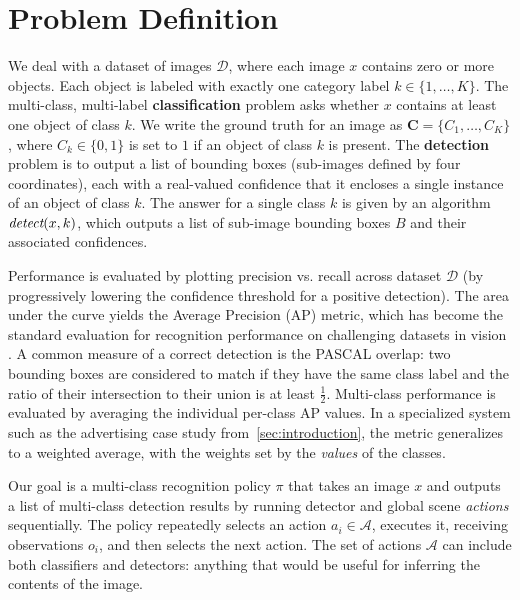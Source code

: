 \section{Problem Definition}\label{sec:det_problem}



We deal with a dataset of images $\mathcal{D}$, where each image $x$ contains zero or more objects.
Each object is labeled with exactly one category label $k \in \{1, \dots, K\}$.
The multi-class, multi-label \textbf{classification} problem asks whether $x$ contains at least one object of class $k$.
We write the ground truth for an image as $\mathbf{C}=\{C_1, \dots, C_K\}$, where $C_k \in \{0, 1\}$ is set to $1$ if an object of class $k$ is present.
The \textbf{detection} problem is to output a list of bounding boxes (sub-images defined by four coordinates), each with a real-valued confidence that it encloses a single instance of an object of class $k$.
The answer for a single class $k$ is given by an algorithm $\emph{detect}(x,k)$, which outputs a list of sub-image bounding boxes $B$ and their associated confidences.

Performance is evaluated by plotting precision vs. recall across dataset $\mathcal{D}$ (by progressively lowering the confidence threshold for a positive detection).
The area under the curve yields the Average Precision (AP) metric, which has become the standard evaluation for recognition performance on challenging datasets in vision \parencite{pascal-voc-2010}.
A common measure of a correct detection is the PASCAL overlap: two bounding boxes are considered to match if they have the same class label and the ratio of their intersection to their union is at least $\frac{1}{2}$.
Multi-class performance is evaluated by averaging the individual per-class AP values.
In a specialized system such as the advertising case study from~\autoref{sec:introduction}, the metric generalizes to a weighted average, with the weights set by the \emph{values} of the classes.

Our goal is a multi-class recognition policy $\pi$ that takes an image $x$ and outputs a list of multi-class detection results by running detector and global scene \emph{actions} sequentially.
The policy repeatedly selects an action $a_i \in \mathcal{A}$, executes it, receiving observations $o_i$, and then selects the next action.
The set of actions $\mathcal{A}$ can include both classifiers and detectors: anything that would be useful for inferring the contents of the image.

